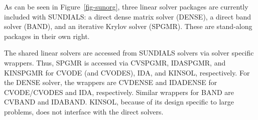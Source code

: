 As can be seen in \mbox{Figure \ref{fig-sunorg}}, three linear solver
packages are currently included with SUNDIALS: a direct dense matrix solver
(DENSE), a direct band solver (BAND), and an iterative Krylov solver
(SPGMR). These are stand-along packages in their own right.

The shared linear solvers are accessed from SUNDIALS solvers via solver
specific wrappers. Thus, SPGMR is accessed via CVSPGMR, IDASPGMR, and
KINSPGMR for CVODE (and CVODES), IDA, and KINSOL, respectively. For the
DENSE solver, the wrappers are CVDENSE and IDADENSE for CVODE/CVODES and
IDA, respectively. Similar wrappers for BAND are CVBAND and IDABAND. KINSOL,
because of its design specific to large problems, does not interface with
the direct solvers.
